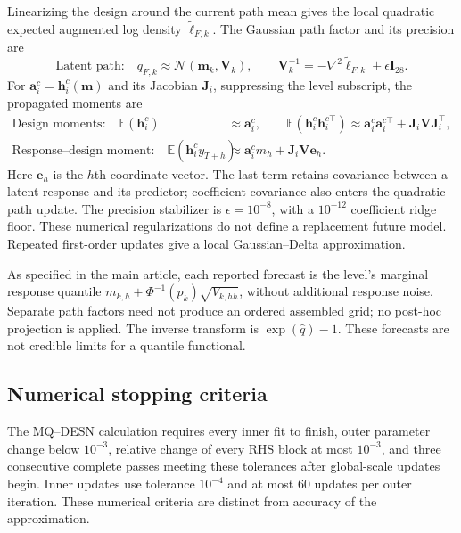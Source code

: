 \documentclass[12pt,letterpaper]{article}
\newcommand{\E}{\mathbb{E}}
\newcommand{\vect}[1]{\bm{#1}}
\newcommand{\mat}[1]{\bm{#1}}
\newcommand{\Normal}{\mathcal{N}}
\numberwithin{suppalgorithm}{section}
\numberwithin{equation}{section}
\numberwithin{table}{section}
\numberwithin{figure}{section}
\begin{document}
Linearizing the design around the current path mean gives the local
quadratic expected augmented log density \(\widetilde\ell_{F,k}\).
The Gaussian path factor and its precision are
\begin{equation}
\text{Latent path:}\quad
q_{F,k}\approx\Normal(\vect m_k,\mat V_k),\qquad
\mat V_k^{-1}=-\nabla^2\widetilde\ell_{F,k}+\epsilon\mat I_{28}.
\label{eq:supp_glofas_future_path_factor}
\end{equation}
For \(\vect a_i^c=\vect h_i^c(\vect m)\) and its Jacobian
\(\mat J_i\), suppressing the level subscript, the propagated moments are
\begin{equation}
\begin{aligned}
\text{Design moments:}\quad
\E(\vect h_i^c)&\approx\vect a_i^c,\qquad
\E(\vect h_i^c\vect h_i^{c\top})
\approx\vect a_i^c\vect a_i^{c\top}+\mat J_i\mat V\mat J_i^\top,\\
\text{Response--design moment:}\quad
\E(\vect h_i^c y_{T+h})&\approx\vect a_i^c m_h+\mat J_i\mat V\vect e_h.
\end{aligned}
\label{eq:supp_glofas_future_path_delta}
\end{equation}
Here \(\vect e_h\) is the \(h\)th coordinate vector. The last term
retains covariance between a latent response and its predictor; coefficient
covariance also enters the quadratic path update. The precision stabilizer
is \(\epsilon=10^{-8}\), with a \(10^{-12}\) coefficient ridge floor.
These numerical regularizations do not define a replacement future model.
Repeated first-order updates give a local Gaussian--Delta approximation.

As specified in the main article, each reported forecast is the level's
marginal response quantile \(m_{k,h}+\Phi^{-1}(p_k)\sqrt{V_{k,hh}}\),
without additional response noise. Separate path factors need not produce
an ordered assembled grid; no post-hoc projection is applied. The
inverse transform is \(\exp(\widehat q)-1\). These forecasts are not
credible limits for a quantile functional.

\subsection{Numerical stopping criteria}
\label{subsec:glofas_checks}

The MQ--DESN calculation requires every inner fit to finish, outer
parameter change below \(10^{-3}\), relative change of every RHS block
at most \(10^{-3}\), and three consecutive complete passes meeting these
tolerances after global-scale updates begin. Inner updates use tolerance
\(10^{-4}\) and at most 60 updates per outer iteration. These numerical
criteria are distinct from accuracy of the approximation.
\end{document}

